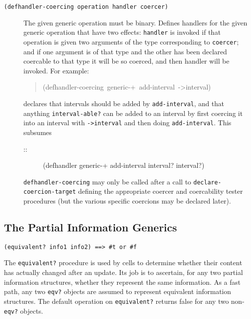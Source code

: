 \documentclass[12pt,letterpaper,english]{article}
\begin{document}
\begin{description}
\item[{\texttt{(defhandler-coercing operation handler coercer)}}] \leavevmode 
The given generic operation must be binary.  Defines handlers for
the given generic operation that have two effects: \texttt{handler} is
invoked if that operation is given two arguments of the type
corresponding to \texttt{coercer}; and if one argument is of that type
and the other has been declared coercable to that type it will be so
coerced, and then handler will be invoked.  For example:
\begin{quote}{\ttfamily \raggedright \noindent
(defhandler-coercing~generic-+~add-interval~->interval)
}\end{quote}
declares that intervals should be added by \texttt{add-interval}, and
that anything \texttt{interval-able?} can be added to an interval by
first coercing it into an interval with \texttt{->interval} and then
doing \texttt{add-interval}.  This subsumes
\begin{description}
\item[{::}] \leavevmode 
(defhandler generic-+ add-interval interval? interval?)

\end{description}

\texttt{defhandler-coercing} may only be called after a call to
\texttt{declare-coercion-target} defining the appropriate coercer and
coercability tester procedures (but the various specific coercions
may be declared later).

\end{description}



\hypertarget{the-partial-information-generics}{}
\subsection{The Partial Information Generics}
\label{the-partial-information-generics}

\texttt{(equivalent? info1 info2)  ==>  {\#}t or {\#}f}

The \texttt{equivalent?} procedure is used by cells to determine whether
their content has actually changed after an update.  Its job is to
ascertain, for any two partial information structures, whether they
represent the same information.  As a fast path, any two \texttt{eqv?}
objects are assumed to represent equivalent information structures.
The default operation on \texttt{equivalent?} returns false for any two
non-\texttt{eqv?} objects.
\end{document}
